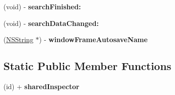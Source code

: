 \begin{DoxyCompactItemize}
\item 
\hypertarget{interface_p_a_d_inspector_controller_ad6b869ebd4ee3a1b6952d7f191711af7}{
(void) -\/ {\bfseries searchFinished:}}
\label{interface_p_a_d_inspector_controller_ad6b869ebd4ee3a1b6952d7f191711af7}

\item 
\hypertarget{interface_p_a_d_inspector_controller_ae58f55ff4dadc234ea9bf3887d0d727d}{
(void) -\/ {\bfseries searchDataChanged:}}
\label{interface_p_a_d_inspector_controller_ae58f55ff4dadc234ea9bf3887d0d727d}

\item 
\hypertarget{interface_p_a_d_inspector_controller_a42d20e8fe037d401f747657affdb6d39}{
(\hyperlink{class_n_s_string}{NSString} $\ast$) -\/ {\bfseries windowFrameAutosaveName}}
\label{interface_p_a_d_inspector_controller_a42d20e8fe037d401f747657affdb6d39}

\end{DoxyCompactItemize}
\subsection*{Static Public Member Functions}
\begin{DoxyCompactItemize}
\item 
\hypertarget{interface_p_a_d_inspector_controller_a0545d127a20e41a4789a1f5be8562dcd}{
(id) + {\bfseries sharedInspector}}
\label{interface_p_a_d_inspector_controller_a0545d127a20e41a4789a1f5be8562dcd}

\end{DoxyCompactItemize}
